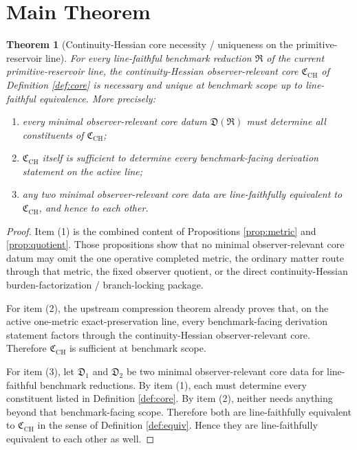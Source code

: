 \documentclass[11pt]{article}
\newcommand{\CoreData}{\mathfrak C_{\mathrm{CH}}}
\newcommand{\Reduction}{\mathfrak R}
\newcommand{\CoreDatum}{\mathfrak D}
\newtheorem{theorem}{Theorem}
\begin{document}
\section{Main Theorem}

\begin{theorem}[Continuity-Hessian core necessity / uniqueness on the primitive-reservoir line]
\label{thm:main}
For every line-faithful benchmark reduction \(\Reduction\) of the current primitive-reservoir line, the continuity-Hessian observer-relevant core \(\CoreData\) of Definition \ref{def:core} is necessary and unique at benchmark scope up to line-faithful equivalence. More precisely:
\begin{enumerate}
    \item every minimal observer-relevant core datum \(\CoreDatum(\Reduction)\) must determine all constituents of \(\CoreData\);
    \item \(\CoreData\) itself is sufficient to determine every benchmark-facing derivation statement on the active line;
    \item any two minimal observer-relevant core data are line-faithfully equivalent to \(\CoreData\), and hence to each other.
\end{enumerate}
\end{theorem}

\begin{proof}
Item (1) is the combined content of Propositions \ref{prop:metric} and \ref{prop:quotient}. Those propositions show that no minimal observer-relevant core datum may omit the one operative completed metric, the ordinary matter route through that metric, the fixed observer quotient, or the direct continuity-Hessian burden-factorization / branch-locking package.

For item (2), the upstream compression theorem already proves that, on the active one-metric exact-preservation line, every benchmark-facing derivation statement factors through the continuity-Hessian observer-relevant core. Therefore \(\CoreData\) is sufficient at benchmark scope.

For item (3), let \(\CoreDatum_1\) and \(\CoreDatum_2\) be two minimal observer-relevant core data for line-faithful benchmark reductions. By item (1), each must determine every constituent listed in Definition \ref{def:core}. By item (2), neither needs anything beyond that benchmark-facing scope. Therefore both are line-faithfully equivalent to \(\CoreData\) in the sense of Definition \ref{def:equiv}. Hence they are line-faithfully equivalent to each other as well.
\end{proof}
\end{document}
